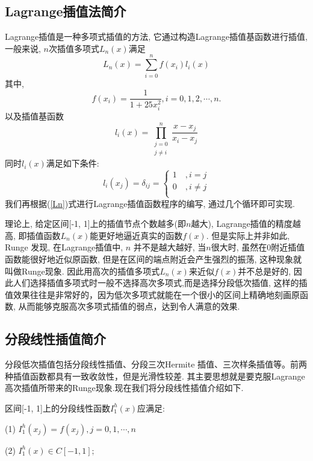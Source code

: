 \documentclass[a4paper]{article}
\begin{document}
\begin{spacing}{1.5}
\begin{CJK*}{GBK}{song}
\subsection{Lagrange插值法简介}
Lagrange插值是一种多项式插值的方法, 它通过构造Lagrange插值基函数进行插值, 一般来说, $n$次插值多项式$L_n(x)$满足
\begin{equation}\label{Ln}
L_n(x)=\sum_{i=0}^n f(x_i)l_i(x)
\end{equation}
其中,
$$f(x_i)=\frac{1}{1+25x_i^2},i=0,1,2,\cdots,n.$$
以及插值基函数
\begin{equation}
l_i(x)=\mathop{\prod}\limits_{\substack{j=0 \\j\neq i}}^{n}\frac{x-x_j}{x_i-x_j}
\end{equation}
同时$l_i(x)$满足如下条件:
\begin{equation}
l_i(x_j)=\delta_{ij}=\left\{
    \begin{array}{ll}
    1\quad, i=j\\
    0\quad, i\neq j\\
    \end{array} \right.
\end{equation}
我们再根据(\ref{Ln})式进行Lagrange插值函数程序的编写, 通过几个循环即可实现. \par
理论上, 给定区间[-1, 1]上的插值节点个数越多(即$n$越大), Lagrange插值的精度越高, 即插值函数$L_n(x)$能更好地逼近真实的函数$f(x)$. 但是实际上并非如此, Runge 发现, 在Lagrange插值中, $n$ 并不是越大越好, 当$n$很大时, 虽然在0附近插值函数能很好地近似原函数, 但是在区间的端点附近会产生强烈的振荡, 这种现象就叫做Runge现象. 因此用高次的插值多项式$L_n(x)$来近似$f(x)$并不总是好的, 因此人们选择插值多项式时一般不选择高次多项式,而是选择分段低次插值, 这样的插值效果往往是非常好的，因为低次多项式就能在一个很小的区间上精确地刻画原函数, 从而能够克服高次多项式插值的弱点，达到令人满意的效果.

\subsection{分段线性插值简介}
分段低次插值包括分段线性插值、分段三次Hermite 插值、三次样条插值等。前两种插值函数都具有一致收敛性，但是光滑性较差. 其主要思想就是要克服Lagrange高次插值所带来的Runge现象.现在我们将分段线性插值介绍如下.\par
区间[-1, 1]上的分段线性函数$I_1^h(x)$应满足:

(1) $I_1^h(x_j)=f(x_j), j=0,1,\cdots, n$ \par
(2) $I_1^h(x)\in C[-1, 1];$ \par


\end{CJK*}
\end{spacing}
\end{document}
